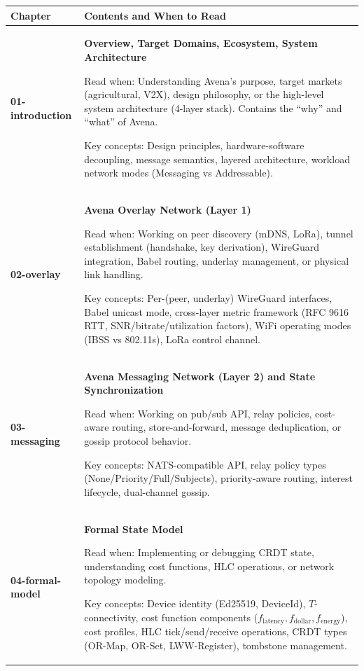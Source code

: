 \documentclass[11pt,a4paper]{article}
\begin{document}
\begin{longtable}{@{}p{3.5cm}p{9.5cm}@{}}
\toprule
\textbf{Chapter} & \textbf{Contents and When to Read} \\
\midrule
\endhead

\textbf{01-introduction} &
\textbf{Overview, Target Domains, Ecosystem, System Architecture}

Read when: Understanding Avena's purpose, target markets (agricultural, V2X), design philosophy, or the high-level system architecture (4-layer stack). Contains the ``why'' and ``what'' of Avena.

Key concepts: Design principles, hardware-software decoupling, message semantics, layered architecture, workload network modes (Messaging vs Addressable). \\
\midrule

\textbf{02-overlay} &
\textbf{Avena Overlay Network (Layer 1)}

Read when: Working on peer discovery (mDNS, LoRa), tunnel establishment (handshake, key derivation), WireGuard integration, Babel routing, underlay management, or physical link handling.

Key concepts: Per-(peer, underlay) WireGuard interfaces, Babel unicast mode, cross-layer metric framework (RFC 9616 RTT, SNR/bitrate/utilization factors), WiFi operating modes (IBSS vs 802.11s), LoRa control channel. \\
\midrule

\textbf{03-messaging} &
\textbf{Avena Messaging Network (Layer 2) and State Synchronization}

Read when: Working on pub/sub API, relay policies, cost-aware routing, store-and-forward, message deduplication, or gossip protocol behavior.

Key concepts: NATS-compatible API, relay policy types (None/Priority/Full/Subjects), priority-aware routing, interest lifecycle, dual-channel gossip. \\
\midrule

\textbf{04-formal-model} &
\textbf{Formal State Model}

Read when: Implementing or debugging CRDT state, understanding cost functions, HLC operations, or network topology modeling.

Key concepts: Device identity (Ed25519, DeviceId), $T$-connectivity, cost function components ($f_{\text{latency}}, f_{\text{dollar}}, f_{\text{energy}}$), cost profiles, HLC tick/send/receive operations, CRDT types (OR-Map, OR-Set, LWW-Register), tombstone management. \\
\midrule


\end{longtable}
\end{document}
